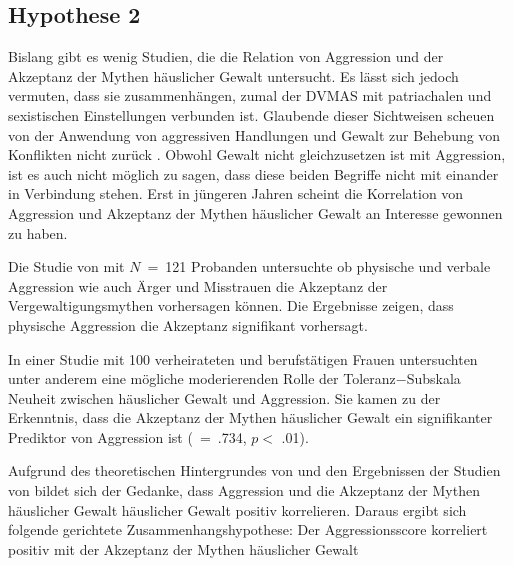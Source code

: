\subsection{Hypothese 2}    \label{subsec_2.2.2}
Bislang gibt es wenig Studien, die die Relation von Aggression und der Akzeptanz der Mythen häuslicher Gewalt untersucht. Es lässt sich jedoch vermuten, dass sie zusammenhängen, zumal der DVMAS mit patriachalen und sexistischen Einstellungen verbunden ist. Glaubende dieser Sichtweisen scheuen von der Anwendung von aggressiven Handlungen und Gewalt zur Behebung von Konflikten nicht zurück \parencite{DVMAS_Peters}. Obwohl Gewalt nicht gleichzusetzen ist mit Aggression, ist es auch nicht möglich zu sagen, dass diese beiden Begriffe nicht mit einander in Verbindung stehen.
Erst in jüngeren Jahren scheint die Korrelation von Aggression und Akzeptanz der Mythen häuslicher Gewalt an Interesse gewonnen zu haben. 

Die Studie von \textcite{H2_u_3_Bhogal_2016} mit $N$~=~121 Probanden untersuchte ob physische und verbale Aggression wie auch Ärger und Misstrauen die Akzeptanz der Vergewaltigungsmythen vorhersagen können. Die Ergebnisse zeigen, dass physische Aggression die Akzeptanz signifikant vorhersagt.

In einer Studie mit 100 verheirateten und berufstätigen Frauen untersuchten \textcite{H1_moderation_2020} unter anderem eine mögliche moderierenden Rolle der Toleranz$-$Subskala Neuheit zwischen häuslicher Gewalt und Aggression. Sie kamen zu der Erkenntnis, dass die Akzeptanz der Mythen häuslicher Gewalt ein signifikanter Prediktor von Aggression ist (\textbeta~=~.734, $p<$ .01).

Aufgrund des theoretischen Hintergrundes von \textcite{DVMAS_Peters} und den Ergebnissen der Studien von \textcite{H1_moderation_2020, H2_u_3_Bhogal_2016} bildet sich der Gedanke, dass Aggression und die Akzeptanz der Mythen häuslicher Gewalt häuslicher Gewalt positiv korrelieren. Daraus ergibt sich folgende gerichtete Zusammenhangshypothese: Der Aggressionsscore korreliert positiv mit der Akzeptanz der Mythen häuslicher Gewalt


